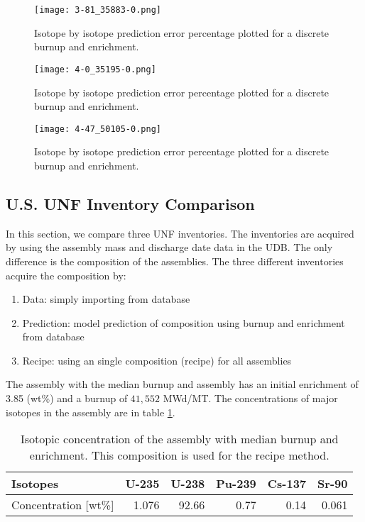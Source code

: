 \begin{figure}
    \centering
    \texttt{[image: 3-81\_35883-0.png]}
    \caption{Isotope by isotope prediction error percentage
             plotted for a discrete burnup and enrichment.
             }
    \label{fig:3-81_35883-0}
\end{figure}

\begin{figure}
    \centering
    \texttt{[image: 4-0\_35195-0.png]}
    \caption{Isotope by isotope prediction error percentage
             plotted for a discrete burnup and enrichment.
             }
    \label{fig:4-0_35195-0}
\end{figure}


\begin{figure}
    \centering
    \texttt{[image: 4-47\_50105-0.png]}
    \caption{Isotope by isotope prediction error percentage
             plotted for a discrete burnup and enrichment.
             }
    \label{fig:4-47_50105-0}
\end{figure}


\subsection{U.S. \gls{UNF} Inventory Comparison}

In this section, we compare three \gls{UNF} inventories.
The inventories are acquired by using the assembly mass and discharge date data
in the \gls{UDB}. The only difference is the composition of the
assemblies. The three different inventories acquire the composition by:

\begin{enumerate}
    \item Data: simply importing from database
    \item Prediction: model prediction of composition using burnup and enrichment from database
    \item Recipe: using an single composition (recipe) for all assemblies
\end{enumerate}

The assembly with the median burnup and assembly has an initial enrichment
of 3.85 (wt\%) and a burnup of $41,552$ MWd/MT. The concentrations of major
isotopes in the assembly are in table \ref{tab:avg_assem}.


\begin{table}[h]
    \centering
    \begin{tabular}{|l|r|r|r|r|r|}
        \hline
        Isotopes & U-235 & U-238 & Pu-239 & Cs-137 & Sr-90 \\
        \hline
        Concentration [wt\%] & 1.076 & 92.66 & 0.77 & 0.14 & 0.061 \\
        \hline
    \end{tabular}
    \caption{Isotopic concentration of the assembly with median burnup and
             enrichment. This composition is used for the recipe method. 
    \label{tab:avg_assem}}
\end{table}


